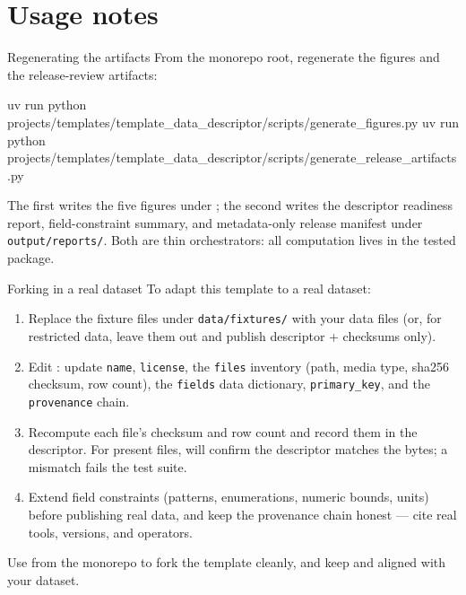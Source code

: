 \documentclass[
  ignorenonframetext,
]{beamer}
\author{\texorpdfstring{}{}}
\date{}
\newenvironment{Shaded}{}{}
\newcommand{\ExtensionTok}[1]{#1}
\newcommand{\NormalTok}[1]{#1}
\providecommand{\tightlist}{%
  \setlength{\itemsep}{0pt}\setlength{\parskip}{0pt}}
\begin{document}
\section{Usage notes}\label{sec:usage}

\begin{frame}{Regenerating the artifacts}
\protect{}\label{regenerating-the-artifacts}
From the monorepo root, regenerate the figures and the release-review
artifacts:

\begin{Shaded}
\begin{Highlighting}[]
\ExtensionTok{uv}\NormalTok{ run python projects/templates/template\_data\_descriptor/scripts/generate\_figures.py}
\ExtensionTok{uv}\NormalTok{ run python projects/templates/template\_data\_descriptor/scripts/generate\_release\_artifacts.py}
\end{Highlighting}
\end{Shaded}

The first writes the five figures under ;
the second writes the descriptor readiness report, field-constraint
summary, and metadata-only release manifest under
\texttt{output/reports/}. Both are thin orchestrators: all computation
lives in the tested  package.
\end{frame}

\begin{frame}{Forking in a real dataset}
\protect{}\label{forking-in-a-real-dataset}
To adapt this template to a real dataset:

\begin{enumerate}
\tightlist
\item
  Replace the fixture files under \texttt{data/fixtures/} with your data
  files (or, for restricted data, leave them out and publish descriptor
  + checksums only).
\item
  Edit : update \texttt{name},
  \texttt{license}, the \texttt{files} inventory (path, media type,
  sha256 checksum, row count), the \texttt{fields} data dictionary,
  \texttt{primary\_key}, and the \texttt{provenance} chain.
\item
  Recompute each file's checksum and row count and record them in the
  descriptor. For present files, 
  will confirm the descriptor matches the bytes; a mismatch fails the
  test suite.
\item
  Extend field constraints (patterns, enumerations, numeric bounds,
  units) before publishing real data, and keep the provenance chain
  honest --- cite real tools, versions, and operators.
\end{enumerate}

Use  from the monorepo to fork
the template cleanly, and keep  and
 aligned with your dataset.
\end{frame}
\end{document}

